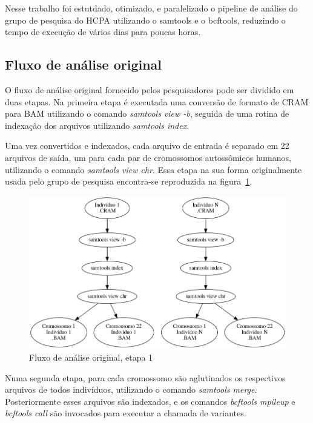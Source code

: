 \documentclass[cic,tc]{iiufrgs}
\begin{document}
Nesse trabalho foi estutdado, otimizado, e paralelizado o pipeline de análise
do grupo de pesquisa do HCPA utilizando o samtools e o bcftools, reduzindo o
tempo de execução de vários dias para poucas horas.

\subsection{Fluxo de análise original}

O fluxo de análise original fornecido pelos pesquisadores pode ser dividido
em duas etapas. Na primeira etapa é executada uma conversão de formato de CRAM
para BAM utilizando o comando \textit{samtools view -b}, seguida de uma rotina
de indexação dos arquivos utilizando \textit{samtools index}.

Uma vez convertidos e indexados, cada arquivo de entrada é separado em 22
arquivos de saída, um para cada par de cromossomos autossômicos humanos,
utilizando o comando \textit{samtools view chr}. Essa etapa na sua forma
originalmente usada pelo grupo de pesquisa encontra-se reproduzida na
figura~\ref{fig:stage1_orig}.

\begin{figure}
  \caption{Fluxo de análise original, etapa 1}
    \begin{center}
      \includegraphics[width=0.85\linewidth]{img/stage1_orig.png}
    \end{center}
    \label{fig:stage1_orig}
\end{figure}

Numa segunda etapa, para cada cromossomo são aglutinados os respectivos
arquivos de todos indivíduos, utilizando o comando \textit{samtools merge}.
Posteriormente esses arquivos são indexados, e os comandos \textit{bcftools
mpileup} e \textit{bcftools call} são invocados para executar a chamada de
variantes.
\end{document}

